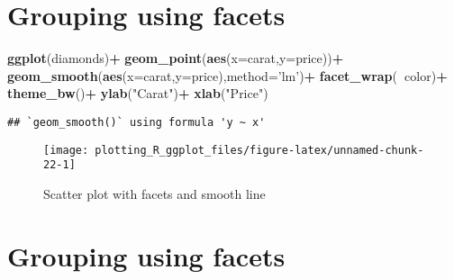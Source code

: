 \documentclass[
]{book}
\newenvironment{Shaded}{\begin{snugshade}}{\end{snugshade}}
\newcommand{\DataTypeTok}[1]{\textcolor[rgb]{0.13,0.29,0.53}{#1}}
\newcommand{\KeywordTok}[1]{\textcolor[rgb]{0.13,0.29,0.53}{\textbf{#1}}}
\newcommand{\NormalTok}[1]{#1}
\newcommand{\OperatorTok}[1]{\textcolor[rgb]{0.81,0.36,0.00}{\textbf{#1}}}
\newcommand{\StringTok}[1]{\textcolor[rgb]{0.31,0.60,0.02}{#1}}
\begin{document}
\hypertarget{grouping-using-facets}{%
\section{Grouping using facets}\label{grouping-using-facets}}

\begin{Shaded}
\begin{Highlighting}[]
         \KeywordTok{ggplot}\NormalTok{(diamonds)}\OperatorTok{+}
\StringTok{          }\KeywordTok{geom_point}\NormalTok{(}\KeywordTok{aes}\NormalTok{(}\DataTypeTok{x=}\NormalTok{carat,}\DataTypeTok{y=}\NormalTok{price))}\OperatorTok{+}
\StringTok{  }\KeywordTok{geom_smooth}\NormalTok{(}\KeywordTok{aes}\NormalTok{(}\DataTypeTok{x=}\NormalTok{carat,}\DataTypeTok{y=}\NormalTok{price),}\DataTypeTok{method=}\StringTok{'lm'}\NormalTok{)}\OperatorTok{+}
\StringTok{  }\KeywordTok{facet_wrap}\NormalTok{(}\OperatorTok{~}\NormalTok{color)}\OperatorTok{+}
\StringTok{  }\KeywordTok{theme_bw}\NormalTok{()}\OperatorTok{+}
\StringTok{  }\KeywordTok{ylab}\NormalTok{(}\StringTok{"Carat"}\NormalTok{)}\OperatorTok{+}\StringTok{ }\KeywordTok{xlab}\NormalTok{(}\StringTok{"Price"}\NormalTok{)}
\end{Highlighting}
\end{Shaded}

\begin{verbatim}
## `geom_smooth()` using formula 'y ~ x'
\end{verbatim}

\begin{figure}

{\centering \texttt{[image: plotting\_R\_ggplot\_files/figure-latex/unnamed-chunk-22-1]} 

}

\caption{Scatter plot with facets and smooth line}\label{fig:unnamed-chunk-22}
\end{figure}

\hypertarget{grouping-using-facets-1}{%
\section{Grouping using facets}\label{grouping-using-facets-1}}

\begin{Shaded}
\end{Shaded}
\end{document}
